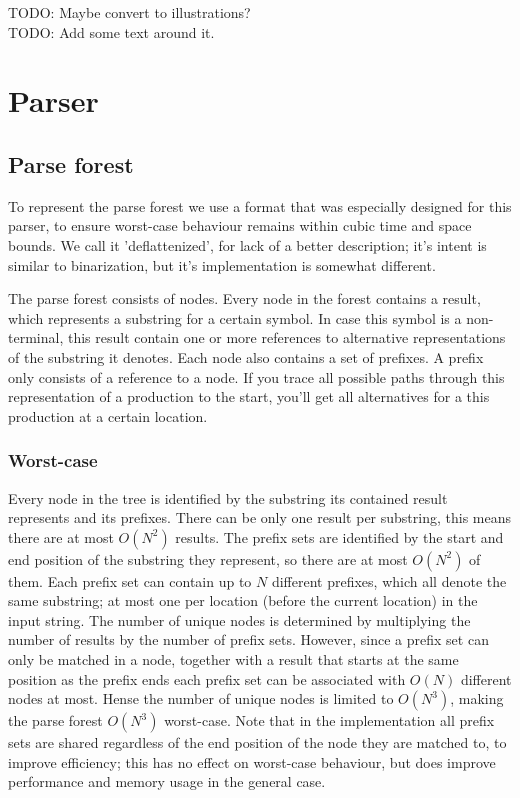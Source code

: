 \documentclass[a4paper,10pt]{article}
\begin{document}
TODO: Maybe convert to illustrations?\\
TODO: Add some text around it.

\section{Parser}

\subsection{Parse forest}

To represent the parse forest we use a format that was especially designed for this parser, to ensure worst-case behaviour remains within cubic time and space bounds. We call it 'deflattenized', for lack of a better description; it's intent is similar to binarization, but it's implementation is somewhat different.

The parse forest consists of nodes. Every node in the forest contains a result, which represents a substring for a certain symbol. In case this symbol is a non-terminal, this result contain one or more references to alternative representations of the substring it denotes. Each node also contains a set of prefixes. A prefix only consists of a reference to a node. If you trace all possible paths through this representation of a production to the start, you'll get all alternatives for a this production at a certain location.

\subsubsection{Worst-case}
Every node in the tree is identified by the substring its contained result represents and its prefixes. There can be only one result per substring, this means there are at most $O(N^2)$ results. The prefix sets are identified by the start and end position of the substring they represent, so there are at most $O(N^2)$ of them. Each prefix set can contain up to $N$ different prefixes, which all denote the same substring; at most one per location (before the current location) in the input string. The number of unique nodes is determined by multiplying the number of results by the number of prefix sets. However, since a prefix set can only be matched in a node, together with a result that starts at the same position as the prefix ends each prefix set can be associated with $O(N)$ different nodes at most. Hense the number of unique nodes is limited to $O(N^3)$, making the parse forest $O(N^3)$ worst-case. Note that in the implementation all prefix sets are shared regardless of the end position of the node they are matched to, to improve efficiency; this has no effect on worst-case behaviour, but does improve performance and memory usage in the general case.
\end{document}
